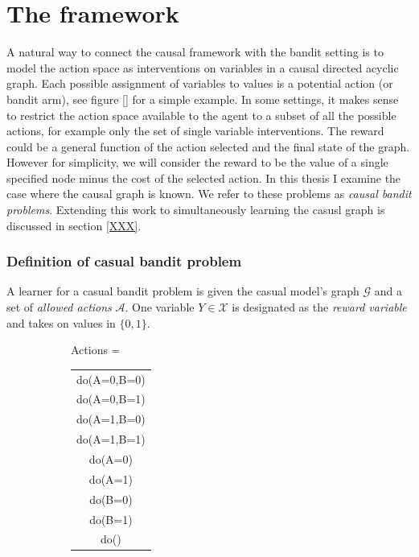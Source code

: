 \documentclass[11pt,a4paper,oneside]{book}
\begin{document}
\section*{The framework}
A natural way to connect the causal framework with the bandit setting is to model the action space as interventions on variables in a causal directed acyclic graph. Each possible assignment of variables to values is a potential action (or bandit arm), see figure \ref{} for a simple example. In some settings, it makes sense to restrict the action space available to the agent to a subset of all the possible actions, for example only the set of single variable interventions. The reward could be a general function of the action selected and the final state of the graph. However for simplicity, we will consider the reward to be the value of a single specified node minus the cost of the selected action. In this thesis I examine the case where the causal graph is known. We refer to these problems as \emph{causal bandit problems}.  Extending this work to simultaneously learning the casusl graph is discussed in section \ref{XXX}.

\subsubsection*{Definition of casual bandit problem} 
A learner for a casual bandit problem is given the casual model's graph $\mathcal{G}$ and a set of \emph{allowed actions} $\mathcal{A}$.
One variable $Y \in \mathcal{X}$ is designated as the \emph{reward variable} and takes on values in $\{0, 1\}$.


\begin{figure}[h]
\caption{A simple causal graphical model and corresponding complete action space. A and B represent binary variables that can be intervened on and Y represents the reward.}
\label{fig:unify_frameworks}
\centering
\begin{subfigure}[c]{0.3\textwidth}
\end{subfigure}
\begin{subfigure}[t]{0.4\textwidth}
Actions = \begin{tabular}{|c|}
	\hline
  do(A=0,B=0) \\
  do(A=0,B=1) \\
  do(A=1,B=0) \\
  do(A=1,B=1) \\
  \hline
  do(A=0) \\
  do(A=1) \\
  do(B=0) \\
  do(B=1) \\
  do() \\
  \hline
\end{tabular}
\end{subfigure}
\end{figure} 
\end{document}
